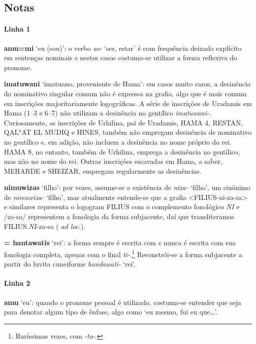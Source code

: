 \subsection*{Notas}

\paragraph{Linha 1}
\textbf{amu=mi} `eu (sou)': o verbo \emph{as-} `ser, estar' é com frequência deixado
explícito em sentenças nominais e nestes casos costuma-se utilizar a
forma reflexiva do pronome.

\noindent\textbf{imatuwani} `imatuano, proveniente de Hama': em casos muito raros, a
desinência do nominativo singular comum não é expressa na grafia, algo que é
mais comum em inscrições majoritariamente logográficas. A série de inscrições de
Uradamis em Hama (1--3 e 6--7) não utilizam a desinência no gentílico
\emph{imatuwani-}.
Curiosamente, as inscrições de Urhilina, pai de Uradamis, HAMA 4,
RESTAN, QALʿAT EL MUDIQ e HINES,
também não empregam desinência de nominativo no gentílico e, em adição, não
incluem a desinência no nome próprio do rei.
HAMA 8, no entanto, também de Urhilina, emprega a desinência no gentílico, mas
não no nome do rei.
Outras inscrições escavadas em Hama, a saber, MEHARDE e SHEIZAR, empregam
regularmente as desinências.

\noindent\textbf{nimuwizas} `filho': por vezes, assume-se a existência de \emph{niza-}
`filho', um sinônimo de \emph{nimuwiza-} `filho', mas atualmente entende-se que
a grafia <FILIUS-ni-za-sa> e similares representa o logogram FILIUS com o
complemento fonológico \emph{NI} e /za-sa/ representem a fonologia da forma
subjacente, daí que transliteramos FILIUS.\emph{NI}-za-sa
( \emph{ad loc.}).

\noindent{} \textbf{= hantawatis} `rei': a forma sempre é escrita com  e
nunca é escrita com sua fonologia completa,
apenas com o final \emph{ti-}.\footnote{Raríssimas vezes, com \emph{-ta-}.}
Reconstrói-se a forma subjacente a partir do luvita cuneiforme
\emph{handawati-} `rei'.

\paragraph{Linha 2}
\textbf{amu} `eu': quando o pronome pessoal é utilizado, costuma-se entender que
seja para denotar algum tipo de ênfase, algo como `eu mesmo, fui eu que\ldots{}'.


